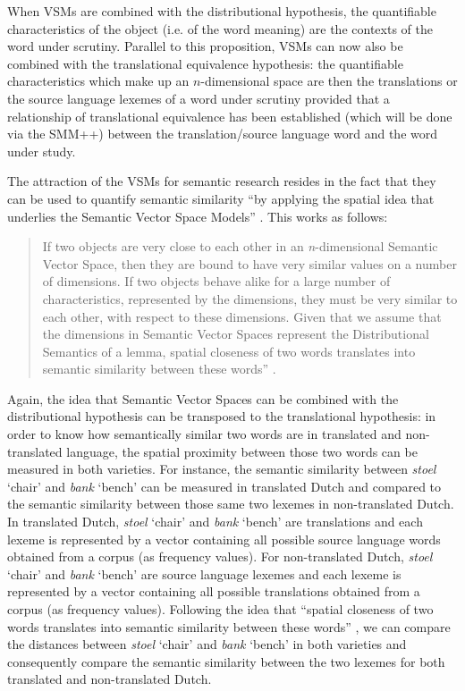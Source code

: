 When VSMs are combined with the distributional hypothesis, the quantifiable characteristics of the object (i.e. of the word meaning) are the contexts of the word under scrutiny. Parallel to this proposition, VSMs can now also be combined with the translational equivalence hypothesis: the quantifiable characteristics which make up an $n$-dimensional space are then the translations or the source language lexemes of a word under scrutiny provided that a relationship of translational equivalence has been established (which will be done via the SMM++) between the translation\slash source language word and the word under study.

The attraction of the VSMs for semantic research resides in the fact that they can be used to quantify semantic similarity “by applying the spatial idea that underlies the Semantic Vector Space Models” \citep[213]{szmrecsanyi_semantic_2014}. This works as follows:

\begin{quote}
If two objects are very close to each other in an \textit{n}{}-dimensional Semantic Vector Space, then they are bound to have very similar values on a number of dimensions. If two objects behave alike for a large number of characteristics, represented by the dimensions, they must be very similar to each other, with respect to these dimensions. Given that we assume that the dimensions in Semantic Vector Spaces represent the Distributional Semantics of a lemma, spatial closeness of two words translates into semantic similarity between these words” \citep[213]{szmrecsanyi_semantic_2014}.
\end{quote}

Again, the idea that Semantic Vector Spaces can be combined with the distributional hypothesis can be transposed to the translational hypothesis: in order to know how semantically similar two words are in translated and non-translated language, the spatial proximity between those two words can be measured in both varieties. For instance, the semantic similarity between \textit{stoel} `chair' and \textit{bank} `bench' can be measured in translated Dutch and compared to the semantic similarity between those same two lexemes in non-translated Dutch. In translated Dutch, \textit{stoel} `chair' and \textit{bank} `bench' are translations and each lexeme is represented by a vector containing all possible source language words obtained from a corpus (as frequency values). For non-translated Dutch, \textit{stoel} `chair' and \textit{bank} `bench' are source language lexemes and each lexeme is represented by a vector containing all possible translations obtained from a corpus (as frequency values). Following the idea that “spatial closeness of two words translates into semantic similarity between these words” \citep[213]{szmrecsanyi_semantic_2014}, we can compare the distances between \textit{stoel} `chair' and \textit{bank} `bench' in both varieties and consequently compare the semantic similarity between the two lexemes for both translated and non-translated Dutch. 

